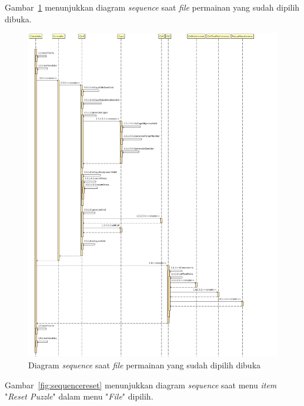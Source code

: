 Gambar~\ref{fig:sequenceloadpuzzlefile} menunjukkan diagram \textit{sequence} saat \textit{file} permainan yang sudah dipilih dibuka.

\begin{figure}
\centering
\captionsetup{justification=centering}
\includegraphics[scale=0.375]{Gambar/Analisis/SequenceDiagramLoadPuzzleFile.png}
\caption[Diagram \textit{sequence} saat \textit{file} permainan yang sudah dipilih dibuka]{Diagram \textit{sequence} saat \textit{file} permainan yang sudah dipilih dibuka}
\label{fig:sequenceloadpuzzlefile}
\end{figure}

Gambar~\ref{fig:sequencereset} menunjukkan diagram \textit{sequence} saat menu \textit{item} "\textit{Reset Puzzle}" dalam menu "\textit{File}" dipilih.

